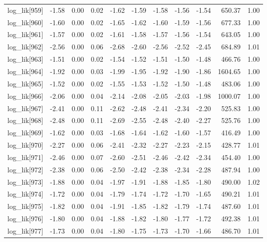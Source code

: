 \begin{table}[ht]
\begin{tabular}{rrrrrrrrrrr}
  log\_lik[959] & -1.58 & 0.00 & 0.02 & -1.62 & -1.59 & -1.58 & -1.56 & -1.54 & 650.37 & 1.00 \\ 
  log\_lik[960] & -1.60 & 0.00 & 0.02 & -1.65 & -1.62 & -1.60 & -1.59 & -1.56 & 677.33 & 1.00 \\ 
  log\_lik[961] & -1.57 & 0.00 & 0.02 & -1.61 & -1.58 & -1.57 & -1.56 & -1.54 & 643.05 & 1.00 \\ 
  log\_lik[962] & -2.56 & 0.00 & 0.06 & -2.68 & -2.60 & -2.56 & -2.52 & -2.45 & 684.89 & 1.01 \\ 
  log\_lik[963] & -1.51 & 0.00 & 0.02 & -1.54 & -1.52 & -1.51 & -1.50 & -1.48 & 466.76 & 1.00 \\ 
  log\_lik[964] & -1.92 & 0.00 & 0.03 & -1.99 & -1.95 & -1.92 & -1.90 & -1.86 & 1604.65 & 1.00 \\ 
  log\_lik[965] & -1.52 & 0.00 & 0.02 & -1.55 & -1.53 & -1.52 & -1.50 & -1.48 & 483.06 & 1.00 \\ 
  log\_lik[966] & -2.06 & 0.00 & 0.04 & -2.14 & -2.08 & -2.05 & -2.03 & -1.98 & 1000.07 & 1.00 \\ 
  log\_lik[967] & -2.41 & 0.00 & 0.11 & -2.62 & -2.48 & -2.41 & -2.34 & -2.20 & 525.83 & 1.00 \\ 
  log\_lik[968] & -2.48 & 0.00 & 0.11 & -2.69 & -2.55 & -2.48 & -2.40 & -2.27 & 525.76 & 1.00 \\ 
  log\_lik[969] & -1.62 & 0.00 & 0.03 & -1.68 & -1.64 & -1.62 & -1.60 & -1.57 & 416.49 & 1.00 \\ 
  log\_lik[970] & -2.27 & 0.00 & 0.06 & -2.41 & -2.32 & -2.27 & -2.23 & -2.15 & 428.77 & 1.01 \\ 
  log\_lik[971] & -2.46 & 0.00 & 0.07 & -2.60 & -2.51 & -2.46 & -2.42 & -2.34 & 454.40 & 1.00 \\ 
  log\_lik[972] & -2.38 & 0.00 & 0.06 & -2.50 & -2.42 & -2.38 & -2.34 & -2.28 & 487.94 & 1.00 \\ 
  log\_lik[973] & -1.88 & 0.00 & 0.04 & -1.97 & -1.91 & -1.88 & -1.85 & -1.80 & 490.00 & 1.02 \\ 
  log\_lik[974] & -1.72 & 0.00 & 0.04 & -1.79 & -1.74 & -1.72 & -1.70 & -1.65 & 490.21 & 1.01 \\ 
  log\_lik[975] & -1.82 & 0.00 & 0.04 & -1.91 & -1.85 & -1.82 & -1.79 & -1.74 & 487.60 & 1.01 \\ 
  log\_lik[976] & -1.80 & 0.00 & 0.04 & -1.88 & -1.82 & -1.80 & -1.77 & -1.72 & 492.38 & 1.01 \\ 
  log\_lik[977] & -1.73 & 0.00 & 0.04 & -1.80 & -1.75 & -1.73 & -1.70 & -1.66 & 486.70 & 1.01 \\ 

\end{tabular}
\end{table}
